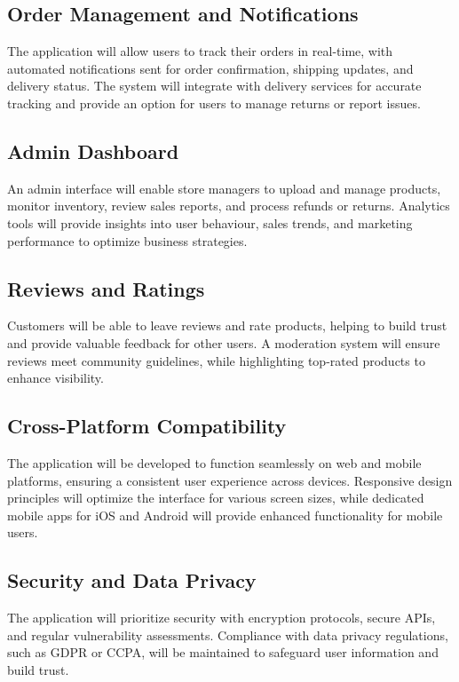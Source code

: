 \documentclass[conference]{IEEEtran}
\begin{document}
\subsection{Order Management and Notifications}
The application will allow users to track their orders in real-time, with automated notifications sent for order confirmation, shipping updates, and delivery status. The system will integrate with delivery services for accurate tracking and provide an option for users to manage returns or report issues.

\subsection{Admin Dashboard}
An admin interface will enable store managers to upload and manage products, monitor inventory, review sales reports, and process refunds or returns. Analytics tools will provide insights into user behaviour, sales trends, and marketing performance to optimize business strategies.


\subsection{Reviews and Ratings}
Customers will be able to leave reviews and rate products, helping to build trust and provide valuable feedback for other users. A moderation system will ensure reviews meet community guidelines, while highlighting top-rated products to enhance visibility.

\subsection{Cross-Platform Compatibility}
The application will be developed to function seamlessly on web and mobile platforms, ensuring a consistent user experience across devices. Responsive design principles will optimize the interface for various screen sizes, while dedicated mobile apps for iOS and Android will provide enhanced functionality for mobile users.

\subsection{Security and Data Privacy}
The application will prioritize security with encryption protocols, secure APIs, and regular vulnerability assessments. Compliance with data privacy regulations, such as GDPR or CCPA, will be maintained to safeguard user information and build trust.
\end{document}
